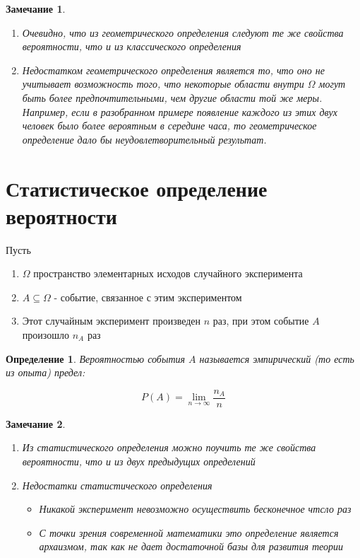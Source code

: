 \documentclass[a4paper, 14pt]{report}
\newtheorem{defenition}{Определение}[chapter]
\newtheorem{note}{Замечание}[chapter]
\begin{document}
\begin{note}
    \begin{enumerate}
        \item Очевидно, что из геометрического определения следуют те же свойства вероятности, что и из классического определения
        \item Недостатком геометрического определения является то, что оно не учитывает возможность того, что некоторые области внутри $\Omega$ могут быть более предпочтительными, чем другие области той же меры. Например, если в разобранном примере появление каждого из этих двух человек было более вероятным в середине часа, то геометрическое определение дало бы неудовлетворительный результат.
    \end{enumerate}
\end{note}

\section{Статистическое определение вероятности}

Пусть 

\begin{enumerate}
    \item $\Omega$ пространство элементарных исходов случайного эксперимента
    \item $A \subseteq \Omega$ - событие, связанное с этим экспериментом
    \item Этот случайным эксперимент произведен $n$ раз, при этом событие $A$ произошло $n_A$ раз
\end{enumerate}

\begin{defenition}
    Вероятностью события $A$ называется эмпирический (то есть из опыта) предел:

    $$
    P(A) = \lim_{n \to \infty} \frac{n_A}{n}
    $$
\end{defenition}

\begin{note}
    \begin{enumerate}
        \item Из статистического определения можно поучить те же свойства вероятности, что и из двух предыдущих определений
        \item Недостатки статистического определения

            \begin{itemize}
                \item Никакой эксперимент невозможно осуществить бесконечное чтсло раз
                \item С точки зрения современной математики это определение является архаизмом, так как не дает достаточной базы для развития теории
            \end{itemize}
    \end{enumerate}
\end{note}
\end{document}

